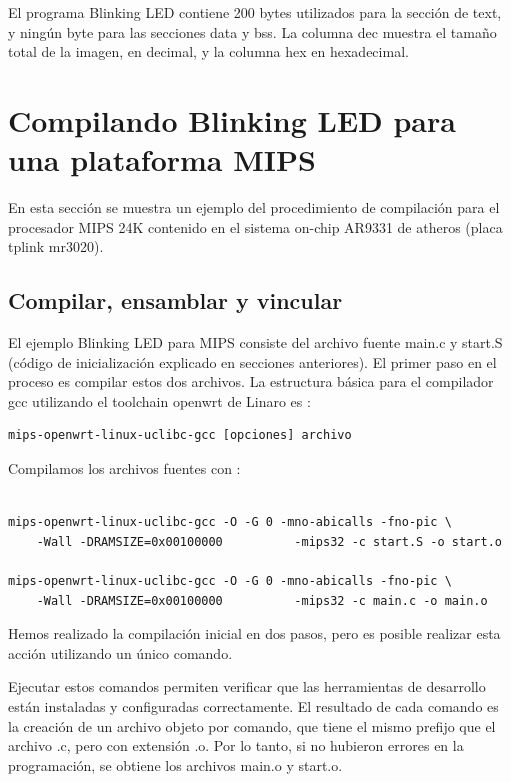 \documentclass[output=paper, 
colorlinks,
citecolor=brown,
newtxmath
]{langscibook}
\begin{document}
El programa Blinking LED contiene 200 bytes utilizados para la sección de text, y
ningún byte para las secciones data y bss. La columna dec muestra el tamaño
total de la imagen, en decimal, y la columna hex en hexadecimal.


\section {Compilando Blinking LED para una plataforma MIPS}

En esta sección se muestra un ejemplo del procedimiento de compilación 
para el procesador MIPS 24K contenido en el sistema on-chip AR9331 de atheros
(placa tplink mr3020).

\subsection {Compilar, ensamblar y vincular}

El ejemplo Blinking LED para MIPS consiste del archivo fuente main.c y start.S
(código de inicialización explicado en secciones anteriores).
El primer paso en el proceso es compilar estos dos archivos.
La estructura básica para el compilador gcc utilizando el toolchain openwrt
de Linaro es :

\begin{verbatim}
mips-openwrt-linux-uclibc-gcc [opciones] archivo
\end{verbatim}

Compilamos los archivos fuentes con :

\begin{verbatim}

mips-openwrt-linux-uclibc-gcc -O -G 0 -mno-abicalls -fno-pic \
    -Wall -DRAMSIZE=0x00100000          -mips32 -c start.S -o start.o

mips-openwrt-linux-uclibc-gcc -O -G 0 -mno-abicalls -fno-pic \
    -Wall -DRAMSIZE=0x00100000          -mips32 -c main.c -o main.o

\end{verbatim}

Hemos realizado la compilación inicial en dos pasos, pero es posible realizar
esta acción utilizando un único comando.

Ejecutar estos comandos permiten verificar que las herramientas de desarrollo
están instaladas y configuradas correctamente. El resultado 
de cada comando es la creación de un archivo objeto por comando, que tiene
el mismo prefijo que el archivo .c, pero con extensión .o.
Por lo tanto, si no hubieron errores en la programación, se obtiene
los archivos main.o y start.o.
\end{document}
